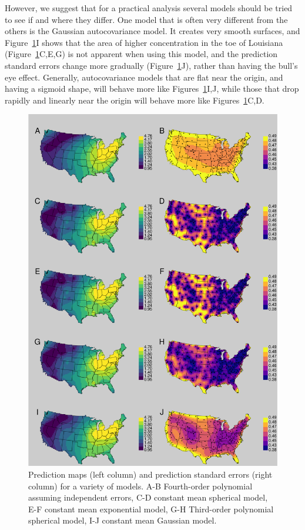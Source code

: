 \documentclass[12pt, titlepage]{article}
\begin{document}
However, we suggest that for a practical analysis several models should be tried to see if and where they differ.  One model that is often very different from the others is the Gaussian autocovariance model.  It creates very smooth surfaces, and Figure~\ref{Fig:SO4_predMaps}I shows that the area of higher concentration in the toe of Louisiana (Figure~\ref{Fig:SO4_predMaps}C,E,G) is not apparent when using this model, and the prediction standard errors change more gradually (Figure~\ref{Fig:SO4_predMaps}J), rather than having the bull's eye effect.  Generally, autocovariance models that are flat near the origin, and having a sigmoid shape, will behave more like Figures~\ref{Fig:SO4_predMaps}I,J, while those that drop rapidly and linearly near the origin will behave more like Figures~\ref{Fig:SO4_predMaps}C,D.

\begin{figure}[H]
  \begin{center}
	    \includegraphics[width=.8\linewidth]{SO4_Prediction_Maps}
  \end{center}
  \caption{Prediction maps (left column) and prediction standard errors (right column) for a variety of models. A-B Fourth-order polynomial assuming independent errors, C-D constant mean spherical model, E-F constant mean exponential model, G-H Third-order polynomial spherical model, I-J constant mean Gaussian model. \label{Fig:SO4_predMaps}}
\end{figure}
\end{document}
